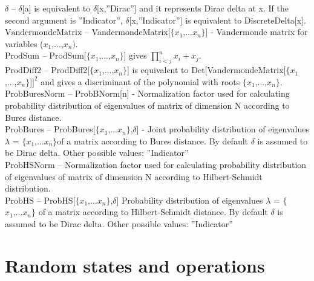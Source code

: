 \documentclass[a4paper,10pt]{scrartcl}
\begin{document}
\noindent\textbf{$ \delta  $ }-- $\delta $[a] is equivalent to $\delta $[x,''Dirac''] and it represents Dirac delta at x. If the second argument is ''Indicator'', $\delta $[x,''Indicator''] is equivalent to DiscreteDelta[x].$  $\\[8pt]
\noindent\textbf{$ \text{VandermondeMatrix} $ }-- VandermondeMatrix[$\{$$ x_1\text{,...}x_n $$\}$] - Vandermonde matrix for variables ($ x_1 $,...,$ x_n\text{).} $\\[8pt]
\noindent\textbf{$ \text{ProdSum} $ }-- ProdSum[$\{$$ x_1 $,...,$ x_n $$\}$] gives $ \prod _{i<j}^nx_i+x_j. $\\[8pt]
\noindent\textbf{$ \text{ProdDiff2} $ }-- ProdDiff2[$\{$$ x_1 $,...,$ x_n $$\}$] is equivalent to Det[VandermondeMatrix[$\{$$ x_1 $,...,$ x_n $$\}$]$ ]^2 $ and gives a discriminant of the polynomial with roots $\{$$ x_1 $,...,$ x_n $$\}$.$  $\\[8pt]
\noindent\textbf{$ \text{ProbBuresNorm} $ }-- ProbBNorm[n] - Normalization factor used for calculating probability distribution of eigenvalues of matrix of dimension N according to Bures distance.$  $\\[8pt]
\noindent\textbf{$ \text{ProbBures} $ }-- ProbBures[$\{$$ x_1\text{,...}x_n $$\}$,$\delta $] - Joint probability distribution of eigenvalues $\lambda $ = $\{$$ x_1\text{,...}x_n $$\}$of a matrix according to Bures distance. By default $\delta $ is assumed to be Dirac delta. Other possible values: ''Indicator''$  $\\[8pt]
\noindent\textbf{$ \text{ProbHSNorm} $ }-- Normalization factor used for calculating probability distribution of eigenvalues of matrix of dimension N according to Hilbert-Schmidt distribution.$  $\\[8pt]
\noindent\textbf{$ \text{ProbHS} $ }-- ProbHS[$\{$$ x_1\text{,...}x_n $$\}$,$\delta $] Probability distribution of eigenvalues $\lambda $ = $\{$$ x_1\text{,...}x_n $$\}$ of a matrix according to Hilbert-Schmidt distance. By default $\delta $ is assumed to be Dirac delta. Other possible values: ''Indicator''$  $\\[8pt]
\section{Random states and operations}
\end{document}

